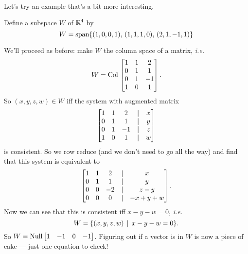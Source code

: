 Let's try an example that's a bit more interesting. 

\begin{myexample}
Define a subspace $W$ of $\mathbb{R}^4$ by $$W=\textrm{span}\{ (1,0,0,1),\, (1,1,1,0),\, (2,1,-1,1)\}$$

We'll proceed as before: make $W$ the column space of a matrix, \emph{i.e.}
$$W=\operatorname{Col\,} \left[ \begin{matrix} 1&1&2\\0&1&1\\0&1&-1\\1&0&1 \end{matrix} \right].$$ So $(x,y,z,w)\in W$ iff the system with augmented matrix 
$$\left[ \begin{matrix} 1&1&2&|&x\\0&1&1&|&y\\0&1&-1&|&z\\1&0&1&|&w \end{matrix} \right]$$is consistent. So we row reduce (and we don't need to go  all the way) and find that this system is equivalent to 
$$\left[ \begin{matrix} 1&1&2&|&x\\0&1&1&|&y\\0&0&-2&|&z-y\\0&0&0&|&-x+y+w \end{matrix} \right].$$
Now we can see that this is consistent iff $x-y-w=0$, \emph{i.e.} $$W=\{(x,y,z,w)\,\mid \, x-y-w=0  \}.$$ So
$W=\operatorname{Null}\left[ \begin{matrix} 1&-1&0&-1 \end{matrix} \right]$. Figuring out if a vector is in $W$ is now a piece of cake --- just one equation to check!

\end{myexample}


